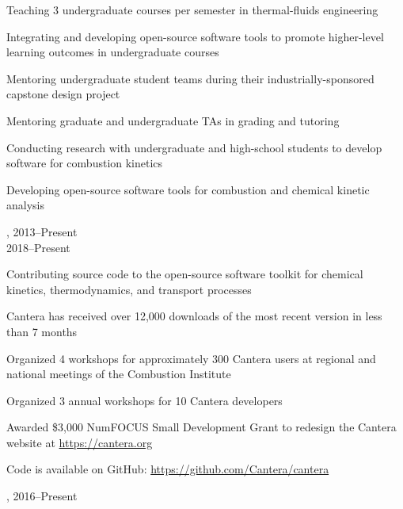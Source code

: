 \begin{innerlist}
    \item Teaching 3 undergraduate courses per semester in thermal-fluids engineering
    \item Integrating and developing open-source software tools to promote higher-level learning outcomes in undergraduate courses
    \item Mentoring undergraduate student teams during their industrially-sponsored capstone design project
    \item Mentoring graduate and undergraduate TAs in grading and tutoring
    \item Conducting research with undergraduate and high-school students to develop software for combustion kinetics
    \item Developing open-source software tools for combustion and chemical kinetic analysis
\end{innerlist}

\vspace{\baselineskip}

,  \hfill 2013--Present\\
 \hfill 2018--Present

\begin{innerlist}
    \item Contributing source code to the open-source software toolkit for chemical kinetics, thermodynamics, and transport processes
    \item Cantera has received over 12,000 downloads of the most recent version in less than 7 months
    \item Organized 4 workshops for approximately 300 Cantera users at regional and national meetings of the Combustion Institute
    \item Organized 3 annual workshops for 10 Cantera developers
    \item Awarded \$3,000 NumFOCUS Small Development Grant to redesign the Cantera website at \url{https://cantera.org}
    \item Code is available on GitHub: \url{https://github.com/Cantera/cantera}
\end{innerlist}

\vspace{\baselineskip}

,  \hfill 2016--Present

